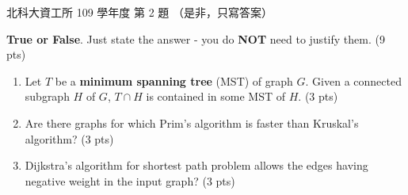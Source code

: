\begin{pastexam}[label={px:ntut-109-ci-03}]{北科大資工所 109 學年度 第 2 題}
（是非，只寫答案）

\textbf{True or False}. Just state the answer - you do \textbf{NOT} need to justify them. (9 pts)
\begin{enumerate}[label=(\arabic*)]
\item Let $T$ be a \textbf{minimum spanning tree} (MST) of graph $G$. Given a connected subgraph $H$
of $G$, $T\cap H$ is contained in some MST of $H$. (3 pts)
\item Are there graphs for which Prim's algorithm is faster than Kruskal's algorithm? (3 pts)
\item Dijkstra's algorithm for shortest path problem allows the edges having negative weight in the
input graph? (3 pts)
\end{enumerate}
\end{pastexam}

